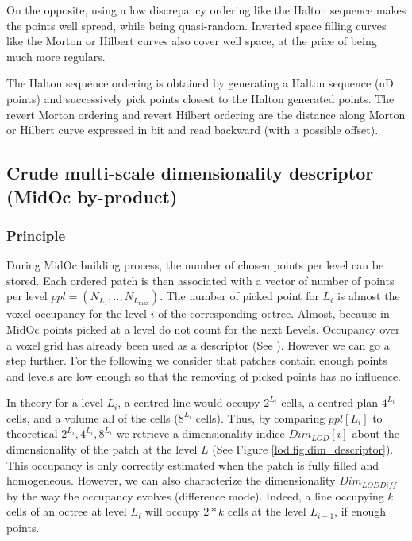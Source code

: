 		On the opposite, using a low discrepancy ordering like the Halton sequence makes the points well spread, while being quasi-random.
		Inverted space filling curves like the Morton or Hilbert curves also cover well space, at the price of being much more regulars.
		
		The Halton sequence ordering is obtained by generating a Halton sequence (nD points) and successively pick points closest to the Halton generated points.
		The revert Morton ordering and revert Hilbert ordering are the distance along Morton or Hilbert curve expressed in bit and read backward (with a possible offset).
		

	\subsection{Crude multi-scale dimensionality descriptor (MidOc by-product)} 
		\label{lod.method.dimdescriptor}
		\subsubsection{Principle}
		During MidOc building process, the number of chosen points per level can be stored.
		Each ordered patch is then associated with a vector of number of points per level $ppl=(N_{L_{1}},..,N_{L_{\text{max}}})$.
		The number of picked point for $L_i$ is almost the voxel occupancy for the level $i$ of the corresponding octree.
		Almost, because in MidOc points picked at a level do not count for the next Levels.
		Occupancy over a voxel grid has already been used as a descriptor (See \cite{Bustos2005}).
		However we can go a step further.
		For the following we consider that patches contain enough points and levels are low enough so that the removing of picked points has no influence.
		
		In theory for a level $L_i$, a centred line would occupy $2^{L_i}$ cells, a centred plan $4^{L_i}$ cells, and a volume all of the cells ($8^{L_i}$ cells).
		Thus, by comparing $ppl[L_i]$ to theoretical $2^{L_i}, 4^{L_i}, 8^{L_i}$ we retrieve a dimensionality indice  $Dim_{LOD}[i]$  about the dimensionality of the patch at the level $L$ (See Figure \ref{lod.fig:dim_descriptor}). 
		This occupancy is only correctly estimated when the patch is fully filled and homogeneous. 
		However, we can also characterize the dimensionality $Dim_{LODDiff}$ by the way the occupancy evolves (difference mode).
		Indeed, a line occupying $k$ cells of an octree at level $L_i$ will occupy $2*k$ cells at the level $L_{i+1}$, if enough points.
		
